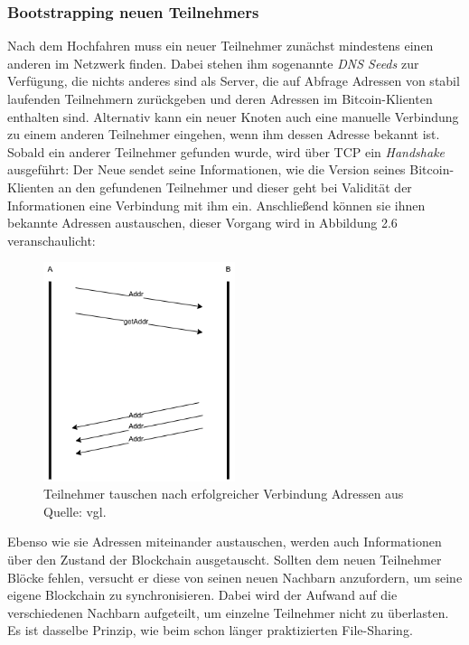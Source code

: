 \subsubsection{Bootstrapping neuen Teilnehmers}
Nach dem Hochfahren muss ein neuer Teilnehmer zunächst mindestens einen anderen im Netzwerk finden. Dabei stehen ihm sogenannte \emph{DNS Seeds} zur Verfügung, die nichts anderes sind als Server, die auf Abfrage Adressen von stabil laufenden Teilnehmern zurückgeben und deren Adressen im Bitcoin-Klienten enthalten sind. 
Alternativ kann ein neuer Knoten auch eine manuelle Verbindung zu einem anderen Teilnehmer eingehen, wenn ihm dessen Adresse bekannt ist.
Sobald ein anderer Teilnehmer gefunden wurde, wird über TCP ein \emph{Handshake} ausgeführt: Der Neue sendet seine Informationen, wie die Version seines Bitcoin-Klienten an den gefundenen Teilnehmer und dieser geht bei Validität der Informationen eine Verbindung mit ihm ein.
Anschließend können sie ihnen bekannte Adressen austauschen, dieser Vorgang wird in Abbildung 2.6 veranschaulicht:
\begin{figure}[htpb]
	\centering
	\includegraphics[width=0.5\textwidth]{images/adress_query.png}
	\caption{Teilnehmer tauschen nach erfolgreicher Verbindung Adressen aus\\
	Quelle: vgl. \cite{antanopoulos_2014}}
	\label{6braun:fig:adress_query}
\end{figure}

Ebenso wie sie Adressen miteinander austauschen, werden auch Informationen über den Zustand der Blockchain ausgetauscht. Sollten dem neuen Teilnehmer Blöcke fehlen, versucht er diese von seinen neuen Nachbarn anzufordern, um seine eigene Blockchain zu synchronisieren. Dabei wird der Aufwand auf die verschiedenen Nachbarn aufgeteilt, um einzelne Teilnehmer nicht zu überlasten. Es ist dasselbe Prinzip, wie beim schon länger praktizierten File-Sharing.
